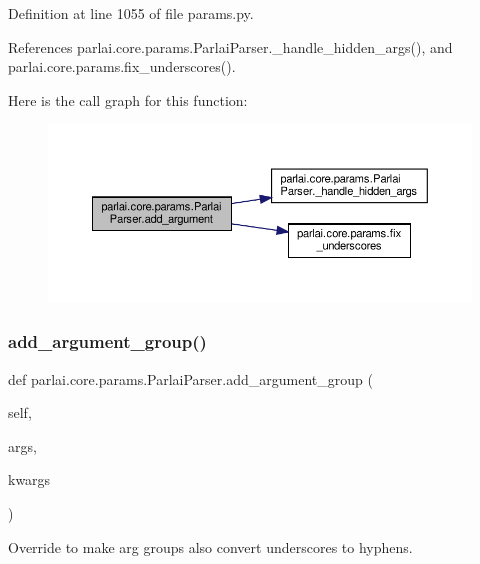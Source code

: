 Definition at line 1055 of file params.\+py.



References parlai.\+core.\+params.\+Parlai\+Parser.\+\_\+handle\+\_\+hidden\+\_\+args(), and parlai.\+core.\+params.\+fix\+\_\+underscores().

Here is the call graph for this function\+:
\nopagebreak
\begin{figure}[H]
\begin{center}
\leavevmode
\includegraphics[width=350pt]{classparlai_1_1core_1_1params_1_1ParlaiParser_a3ecf246ac5ed40769d313a2db962b43e_cgraph}
\end{center}
\end{figure}
\mbox{\label{classparlai_1_1core_1_1params_1_1ParlaiParser_a2855a5676bf638bfc9491577e603eee3}} 
\subsubsection{\texorpdfstring{add\+\_\+argument\+\_\+group()}{add\_argument\_group()}}
{\footnotesize\ttfamily def parlai.\+core.\+params.\+Parlai\+Parser.\+add\+\_\+argument\+\_\+group (\begin{DoxyParamCaption}\item[{}]{self,  }\item[{}]{args,  }\item[{}]{kwargs }\end{DoxyParamCaption})}

\begin{DoxyVerb}Override to make arg groups also convert underscores to hyphens.\end{DoxyVerb}
 

